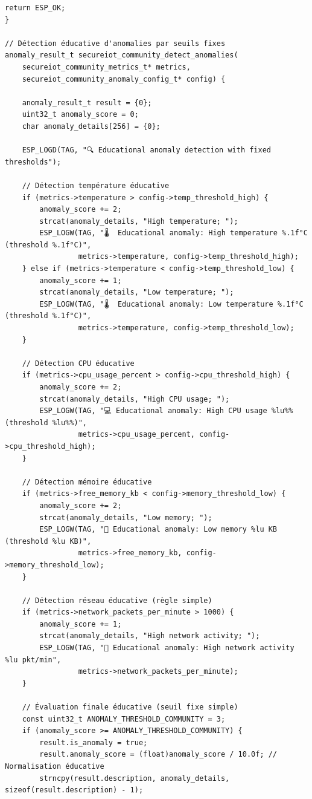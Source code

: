 \begin{lstlisting}[caption={Module éducatif de détection d'anomalies par seuils}]
    return ESP_OK;
}

// Détection éducative d'anomalies par seuils fixes
anomaly_result_t secureiot_community_detect_anomalies(
    secureiot_community_metrics_t* metrics,
    secureiot_community_anomaly_config_t* config) {
    
    anomaly_result_t result = {0};
    uint32_t anomaly_score = 0;
    char anomaly_details[256] = {0};
    
    ESP_LOGD(TAG, "🔍 Educational anomaly detection with fixed thresholds");
    
    // Détection température éducative
    if (metrics->temperature > config->temp_threshold_high) {
        anomaly_score += 2;
        strcat(anomaly_details, "High temperature; ");
        ESP_LOGW(TAG, "🌡️  Educational anomaly: High temperature %.1f°C (threshold %.1f°C)", 
                 metrics->temperature, config->temp_threshold_high);
    } else if (metrics->temperature < config->temp_threshold_low) {
        anomaly_score += 1;
        strcat(anomaly_details, "Low temperature; ");
        ESP_LOGW(TAG, "🌡️  Educational anomaly: Low temperature %.1f°C (threshold %.1f°C)", 
                 metrics->temperature, config->temp_threshold_low);
    }
    
    // Détection CPU éducative
    if (metrics->cpu_usage_percent > config->cpu_threshold_high) {
        anomaly_score += 2;
        strcat(anomaly_details, "High CPU usage; ");
        ESP_LOGW(TAG, "💻 Educational anomaly: High CPU usage %lu%% (threshold %lu%%)", 
                 metrics->cpu_usage_percent, config->cpu_threshold_high);
    }
    
    // Détection mémoire éducative
    if (metrics->free_memory_kb < config->memory_threshold_low) {
        anomaly_score += 2;
        strcat(anomaly_details, "Low memory; ");
        ESP_LOGW(TAG, "💾 Educational anomaly: Low memory %lu KB (threshold %lu KB)", 
                 metrics->free_memory_kb, config->memory_threshold_low);
    }
    
    // Détection réseau éducative (règle simple)
    if (metrics->network_packets_per_minute > 1000) {
        anomaly_score += 1;
        strcat(anomaly_details, "High network activity; ");
        ESP_LOGW(TAG, "📶 Educational anomaly: High network activity %lu pkt/min", 
                 metrics->network_packets_per_minute);
    }
    
    // Évaluation finale éducative (seuil fixe simple)
    const uint32_t ANOMALY_THRESHOLD_COMMUNITY = 3;
    if (anomaly_score >= ANOMALY_THRESHOLD_COMMUNITY) {
        result.is_anomaly = true;
        result.anomaly_score = (float)anomaly_score / 10.0f; // Normalisation éducative
        strncpy(result.description, anomaly_details, sizeof(result.description) - 1);
        

\end{lstlisting}
